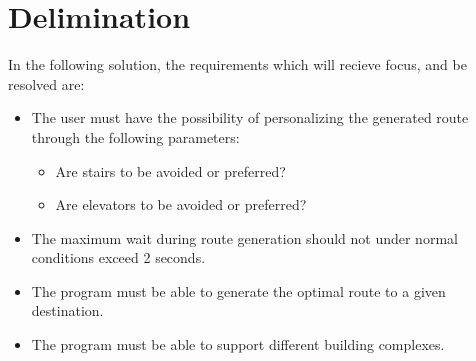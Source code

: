 
\section{Delimination}

In the following solution, the requirements which will recieve focus, and be resolved are:

\begin{itemize}
  \item The user must have the possibility of personalizing the generated route through the following parameters:
      \begin{itemize}
        \item Are stairs to be avoided or preferred?
        \item Are elevators to be avoided or preferred?
      \end{itemize}
  \item The maximum wait during route generation should not under normal conditions exceed 2 seconds.

  \item The program must be able to generate the optimal route to a given destination.

  \item The program must be able to support different building complexes.

\end{itemize}


